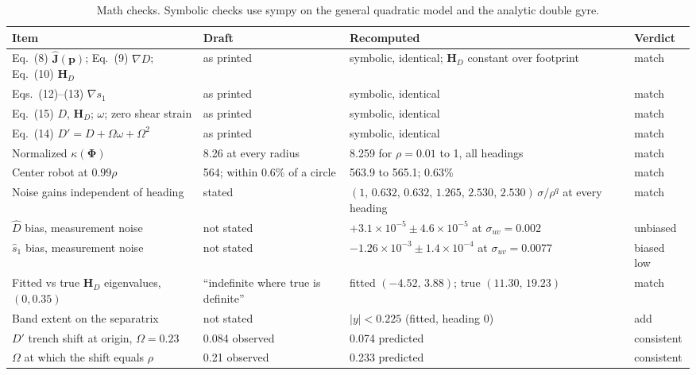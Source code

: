 \documentclass[10.5pt]{article}
\newcommand{\shat}{\hat{s}_1}
\begin{document}
\begin{table}[h]
\centering\small
\caption{Math checks. Symbolic checks use sympy on the general quadratic model and the analytic double gyre.}
\label{tab:math}
\begin{tabularx}{\linewidth}{@{}>{\raggedright}p{4.4cm}>{\raggedright}p{3.6cm}>{\raggedright}Xl@{}}
\toprule
Item & Draft & Recomputed & Verdict\\
\midrule
Eq.~(8) $\hat{\mathbf J}(\mathbf p)$; Eq.~(9) $\nabla D$; Eq.~(10) $\mathbf H_D$ & as printed & symbolic, identical; $\mathbf H_D$ constant over footprint & match\\
Eqs.~(12)--(13) $\nabla s_1$ & as printed & symbolic, identical & match\\
Eq.~(15) $D$, $\mathbf H_D$; $\omega$; zero shear strain & as printed & symbolic, identical & match\\
Eq.~(14) $D'=D+\Omega\omega+\Omega^2$ & as printed & symbolic, identical & match\\
Normalized $\kappa(\boldsymbol\Phi)$ & 8.26 at every radius & 8.259 for $\rho=0.01$ to 1, all headings & match\\
Center robot at $0.99\rho$ & 564; within 0.6\% of a circle & 563.9 to 565.1; 0.63\% & match\\
Noise gains independent of heading & stated & $(1,\,0.632,\,0.632,\,1.265,\,2.530,\,2.530)\,\sigma/\rho^{q}$ at every heading & match\\
$\hat D$ bias, measurement noise & not stated & $+3.1\times10^{-5}\pm4.6\times10^{-5}$ at $\sigma_{uv}=0.002$ & unbiased\\
$\shat$ bias, measurement noise & not stated & $-1.26\times10^{-3}\pm1.4\times10^{-4}$ at $\sigma_{uv}=0.0077$ & biased low\\
Fitted vs true $\mathbf H_D$ eigenvalues, $(0,0.35)$ & ``indefinite where true is definite'' & fitted $(-4.52,\,3.88)$; true $(11.30,\,19.23)$ & match\\
Band extent on the separatrix & not stated & $|y|<0.225$ (fitted, heading 0) & add\\
$D'$ trench shift at origin, $\Omega=0.23$ & 0.084 observed & 0.074 predicted & consistent\\
$\Omega$ at which the shift equals $\rho$ & 0.21 observed & 0.233 predicted & consistent\\
\bottomrule
\end{tabularx}
\end{table}
\end{document}
